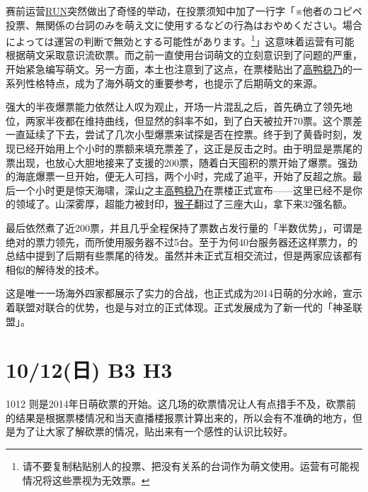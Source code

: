 赛前运营\uline{RUN}突然做出了奇怪的举动，在投票须知中加了一行字「{\mincho ※他者のコピペ投票、無関係の台詞のみを萌え文に使用するなどの行為はおやめください。場合によっては運営の判断で無効とする可能性があります。}\footnote{请不要复制粘贴别人的投票、把没有关系的台词作为萌文使用。运营有可能视情况将这些票视为无效票。}」这意味着运营有可能根据萌文采取意识流砍票。而之前一直使用台词萌文的立刻意识到了问题的严重，开始紧急编写萌文。另一方面，本土也注意到了这点，在票楼贴出了\uline{高鸭稳乃}的一系列性格特点，成为了海外萌文的重要参考，也提示了后期萌文的来源。

强大的半夜爆票能力依然让人叹为观止，开场一片混乱之后，首先确立了领先地位，两家半夜都在维持曲线，但显然的斜率不如，到了白天被拉开70票。这个票差一直延续了下去，尝试了几次小型爆票来试探是否在控票。终于到了黄昏时刻，发现已经开始用上个小时的票额来填充票差了，这正是反击之时。由于明显是票尾的票出现，也放心大胆地接来了支援的200票，随着白天囤积的票开始了爆票。强劲的海底爆票一旦开始，便无人可挡，两个小时，完成了追平，开始了反超之旅。最后一个小时更是惊天海啸，深山之主\uline{高鸭稳乃}在票楼正式宣布——这里已经不是你的领域了。山深雾厚，超能力被封印，\uline{猴子}翻过了三座大山，拿下来32强名额。

最后依然煮了近200票，并且几乎全程保持了票数占发行量的「半数优势」，可谓是绝对的票力领先，而所使用服务器不过5台。至于为何40台服务器还这样票力，的总结中提到了后期有些票尾的待发。虽然并未正式互相交流过，但是两家应该都有相似的解待发的技术。

这是唯一一场海外四家都展示了实力的合战，也正式成为2014日萌的分水岭，宣示着联盟对联合的优势，也是与对立的正式体现。正式发展成为了新一代的「神圣联盟」。

\section{10/12(日) B3 H3}

1012 则是2014年日萌砍票的开始。这几场的砍票情况让人有点措手不及，砍票前的结果是根据票楼情况和当天直播楼报票计算出来的，所以会有不准确的地方，但是为了让大家了解砍票的情况，贴出来有一个感性的认识比较好。

